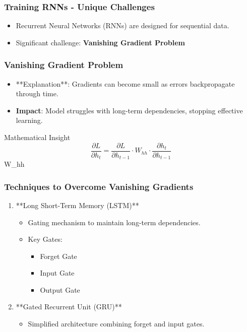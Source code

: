 \documentclass[aspectratio=169]{beamer}
\begin{document}
\begin{frame}[fragile]
    \frametitle{Training RNNs - Unique Challenges}
    \begin{itemize}
        \item Recurrent Neural Networks (RNNs) are designed for sequential data.
        \item Significant challenge: \textbf{Vanishing Gradient Problem}
    \end{itemize}
\end{frame}

\begin{frame}[fragile]
    \frametitle{Vanishing Gradient Problem}
    \begin{itemize}
        \item **Explanation**: Gradients can become small as errors backpropagate through time.
        \item \textbf{Impact}: Model struggles with long-term dependencies, stopping effective learning.
    \end{itemize}
    \begin{block}{Mathematical Insight}
        \begin{equation}
            \frac{\partial L}{\partial h_t} = \frac{\partial L}{\partial h_{t-1}} \cdot W_{hh} \cdot \frac{\partial h_t}{\partial h_{t-1}}
        \end{equation}
         W_{hh} 
    \end{block}
\end{frame}

\begin{frame}[fragile]
    \frametitle{Techniques to Overcome Vanishing Gradients}
    \begin{enumerate}
        \item **Long Short-Term Memory (LSTM)**
            \begin{itemize}
                \item Gating mechanism to maintain long-term dependencies.
                \item Key Gates:
                    \begin{itemize}
                        \item Forget Gate
                        \item Input Gate
                        \item Output Gate
                    \end{itemize}
            \end{itemize}
        \item **Gated Recurrent Unit (GRU)**
            \begin{itemize}
                \item Simplified architecture combining forget and input gates.
            \end{itemize}
    \end{enumerate}
\end{frame}
\end{document}
